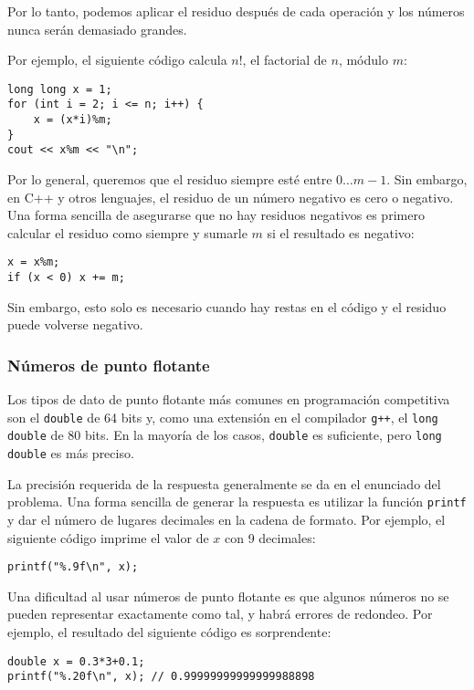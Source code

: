 Por lo tanto, podemos aplicar el residuo después de cada operación
y los números nunca serán demasiado grandes.

Por ejemplo, el siguiente código calcula $n!$,
el factorial de $n$, módulo $m$:
\begin{lstlisting}
long long x = 1;
for (int i = 2; i <= n; i++) {
    x = (x*i)%m;
}
cout << x%m << "\n";
\end{lstlisting}

Por lo general, queremos que el residuo siempre
esté entre $0\ldots m-1$.
Sin embargo, en C++ y otros lenguajes,
el residuo de un número negativo
es cero o negativo.
Una forma sencilla de asegurarse
que no hay residuos negativos es primero calcular
el residuo como siempre y sumarle $m$
si el resultado es negativo:
\begin{lstlisting}
x = x%m;
if (x < 0) x += m;
\end{lstlisting}
Sin embargo, esto solo es necesario cuando hay
restas en el código y
el residuo puede volverse negativo.

\subsubsection{Números de punto flotante}


Los tipos de dato de punto flotante más comunes en
programación competitiva son
el \texttt{double} de 64 bits
y, como una extensión en el compilador \texttt{g++},
el \texttt{long double} de 80 bits.
En la mayoría de los casos, \texttt{double} es suficiente,
pero \texttt{long double} es más preciso.

La precisión requerida de la respuesta 
generalmente se da en el enunciado del problema.
Una forma sencilla de generar la respuesta es utilizar
la función \texttt{printf}
y dar el número de lugares decimales
en la cadena de formato.
Por ejemplo, el siguiente código imprime
el valor de $x$ con 9 decimales:

\begin{lstlisting}
printf("%.9f\n", x);
\end{lstlisting}

Una dificultad al usar números de punto flotante
es que algunos números no se pueden representar
exactamente como tal,
y habrá errores de redondeo.
Por ejemplo, el resultado del siguiente código
es sorprendente:

\begin{lstlisting}
double x = 0.3*3+0.1;
printf("%.20f\n", x); // 0.99999999999999988898
\end{lstlisting}

